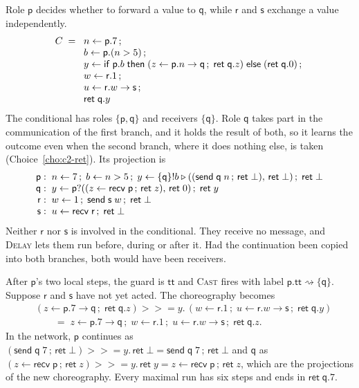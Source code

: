 \documentclass[11pt]{report}
\theoremstyle{plain}
\theoremstyle{definition}
\theoremstyle{remark}
\newcommand{\kw}[1]{\mathsf{#1}}
\newcommand{\pp}{\mathsf{p}}
\newcommand{\qq}{\mathsf{q}}
\newcommand{\rr}{\mathsf{r}}
\newcommand{\sr}{\mathsf{s}}
\newcommand{\ttrue}{\kw{tt}}
\newcommand{\bind}[3]{#1 \leftarrow #2\,;\;#3}
\newcommand{\cret}[1]{\kw{ret}\;#1}
\newcommand{\com}[3]{#1.#2 \to #3}
\newcommand{\cif}[4]{\kw{if}\;#1.#2\;\kw{then}\;#3\;\kw{else}\;#4}
\newcommand{\mbind}[3]{#1 \mathbin{>\!\!>\!\!=} #2.\,#3}
\newcommand{\castlbl}[3]{#1.#2 \rightsquigarrow #3}
\newcommand{\nsend}[2]{\kw{send}\;#1\;#2}
\newcommand{\nrecv}[1]{\kw{recv}\;#1}
\newcommand{\sendbr}[4]{#1!#2 \mathbin{\triangleright} (#3,\,#4)}
\newcommand{\recvbr}[3]{#1?(#2,\,#3)}
\newcommand{\rn}[1]{{\normalfont\scshape #1}}
\begin{document}
Role $\pp$ decides whether to forward a value to $\qq$, while $\rr$ and $\sr$
exchange a value independently.
\[
\begin{array}{r@{\;\;}l}
  C \;=\; & \bind{n}{\pp.7}{}\\
          & \bind{b}{\pp.(n>5)}{}\\
          & \bind{y}{\cif{\pp}{b}{(\bind{z}{\com{\pp}{n}{\qq}}{\cret{\qq.z}})}{(\cret{\qq.0})}}{}\\
          & \bind{w}{\rr.1}{}\\
          & \bind{u}{\com{\rr}{w}{\sr}}{}\\
          & \cret{\qq.y}
\end{array}
\]
The conditional has roles $\{\pp,\qq\}$ and receivers $\{\qq\}$.  Role $\qq$
takes part in the communication of the first branch, and it holds the result
of both, so it learns the outcome even when the second branch, where it does
nothing else, is taken (Choice~\ref{cho:c2-ret}).  Its projection is
\[
\begin{array}{r@{\;\;}l}
  \pp: & n\leftarrow 7\,;\; b\leftarrow n>5\,;\;
         y\leftarrow\sendbr{\{\qq\}}{b}{(\nsend{\qq}{n}\,;\,\kw{ret}\;\bot)}{\kw{ret}\;\bot}\,;\;\kw{ret}\;\bot\\
  \qq: & y\leftarrow\recvbr{\pp}{(z\leftarrow\nrecv{\pp}\,;\,\kw{ret}\;z)}{\kw{ret}\;0}\,;\;\kw{ret}\;y\\
  \rr: & w\leftarrow 1\,;\;\nsend{\sr}{w}\,;\;\kw{ret}\;\bot\\
  \sr: & u\leftarrow\nrecv{\rr}\,;\;\kw{ret}\;\bot
\end{array}
\]
Neither $\rr$ nor $\sr$ is involved in the conditional.  They receive no
message, and \rn{Delay} lets them run before, during or after it.  Had the
continuation been copied into both branches, both would have been receivers.

After $\pp$'s two local steps, the guard is $\ttrue$ and \rn{Cast} fires with
label $\castlbl{\pp}{\ttrue}{\{\qq\}}$.  Suppose $\rr$ and $\sr$ have not yet
acted.  The choreography becomes
\begin{align*}
  &\mbind{(\bind{z}{\com{\pp}{7}{\qq}}{\cret{\qq.z}})}{y}{(\bind{w}{\rr.1}{\bind{u}{\com{\rr}{w}{\sr}}{\cret{\qq.y}}})}\\
  &\qquad=\;
  \bind{z}{\com{\pp}{7}{\qq}}{\bind{w}{\rr.1}{\bind{u}{\com{\rr}{w}{\sr}}{\cret{\qq.z}}}}.
\end{align*}
In the network, $\pp$ continues as
$\mbind{(\nsend{\qq}{7}\,;\,\kw{ret}\;\bot)}{y}{\kw{ret}\;\bot}=\nsend{\qq}{7}\,;\,\kw{ret}\;\bot$
and $\qq$ as
$\mbind{(z\leftarrow\nrecv{\pp}\,;\,\kw{ret}\;z)}{y}{\kw{ret}\;y}=z\leftarrow\nrecv{\pp}\,;\,\kw{ret}\;z$,
which are the projections of the new choreography.  Every maximal run has six
steps and ends in $\cret{\qq.7}$.
\end{document}
